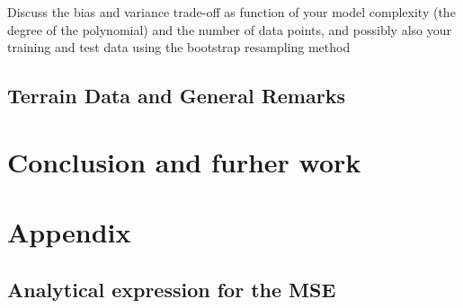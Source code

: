 \documentclass[aps,rmp,reprint,amsmath,amssymb,graphicx,longbibliography]{revtex4-1}
\begin{document}
Discuss the bias and variance trade-off as function of your model complexity
(the degree of the polynomial) and the number of data points, and possibly also
your training and test data using the bootstrap resampling method


\subsection{Terrain Data and General Remarks}

\section{Conclusion and furher work}

\section{Appendix}
\subsection{Analytical expression for the MSE}
\label{appendix:MSE}



\end{document}
